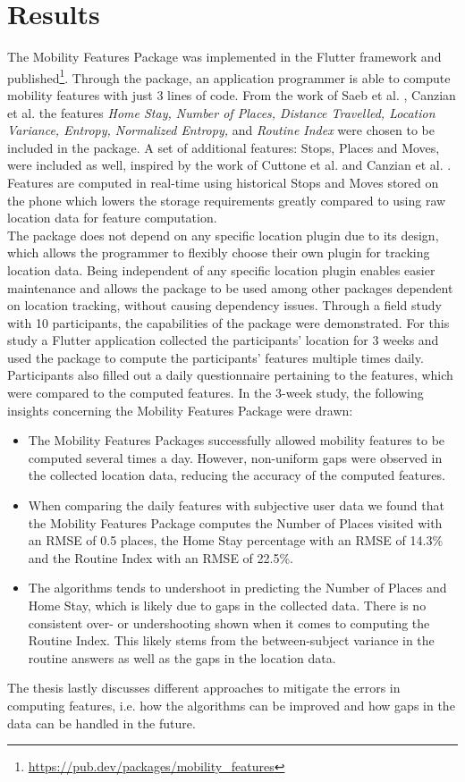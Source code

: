 \section{Results}
The Mobility Features Package was implemented in the Flutter framework and published\footnote{\url{https://pub.dev/packages/mobility_features}}. Through the package, an application programmer is able to compute mobility features with just 3 lines of code. From the work of Saeb et al. \cite{Saeb2015}, Canzian et al. \cite{Canzian2015} the features \textit{Home Stay, Number of Places, Distance Travelled, Location Variance, Entropy, Normalized Entropy,} and \textit{Routine Index} were chosen to be included in the package. A set of additional features: Stops, Places and Moves, were included as well, inspired by the work of Cuttone et al. \cite{sparse-location-2014} and Canzian et al. \cite{Canzian2015}. Features are computed in real-time using historical Stops and Moves stored on the phone which lowers the storage requirements greatly compared to using raw location data for feature computation.\\

The package does not depend on any specific location plugin due to its design, which allows the programmer to flexibly choose their own plugin for tracking location data. Being independent of any specific location plugin enables easier maintenance and allows the package to be used among other packages dependent on location tracking, without causing dependency issues. Through a field study with 10 participants, the capabilities of the package were demonstrated. For this study a Flutter application collected the participants' location for 3 weeks and used the package to compute the participants' features multiple times daily. Participants also filled out a daily questionnaire pertaining to the features, which were compared to the computed features. In the 3-week study, the following insights concerning the Mobility Features Package were drawn:

\begin{itemize}
    \item The Mobility Features Packages successfully allowed mobility features to be computed several times a day. However, non-uniform gaps were observed in the collected location data, reducing the accuracy of the computed features. 
    
    \item When comparing the daily features with subjective user data we found that the Mobility Features Package computes the Number of Places visited with an RMSE of 0.5 places, the Home Stay percentage with an RMSE of 14.3\% and the Routine Index with an RMSE of 22.5\%.
    
    \item The algorithms tends to undershoot in predicting the Number of Places and Home Stay, which is likely due to gaps in the collected data. There is no consistent over- or undershooting shown when it comes to computing the Routine Index. This likely stems from the between-subject variance in the routine answers as well as the gaps in the location data.
\end{itemize}

The thesis lastly discusses different approaches to mitigate the errors in computing features, i.e. how the algorithms can be improved and how gaps in the data can be handled in the future. 